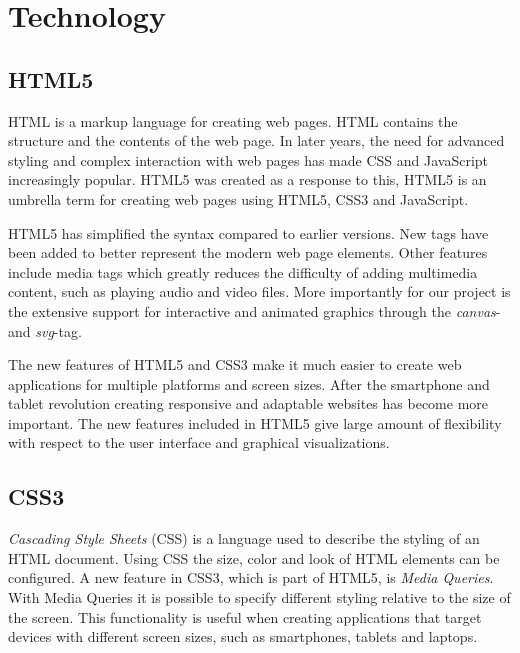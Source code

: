 \chapter{Technology} %

\label{Chapter2} %


\section{HTML5}
HTML is a markup language for creating web pages. HTML contains the structure and the contents of the web page. In later years, the need for advanced styling and complex interaction with web pages has made CSS and JavaScript increasingly popular. HTML5 was created as a response to this, HTML5 is an umbrella term for creating web pages using HTML5, CSS3 and JavaScript.

HTML5 has simplified the syntax compared to earlier versions. New tags have been added to better represent the modern web page elements. Other features include media tags which greatly reduces the difficulty of adding multimedia content, such as playing audio and video files. More importantly for our project is the extensive support for interactive and animated graphics through the \emph{canvas}- and \emph{svg}-tag.

The new features of HTML5 and CSS3 make it much easier to create web applications for multiple platforms and screen sizes. After the smartphone and tablet revolution creating responsive and adaptable websites has become more important. The new features included in HTML5 give large amount of flexibility with respect to the user interface and graphical visualizations.

\section{CSS3}
\emph{Cascading Style Sheets} (CSS) is a language used to describe the styling of an HTML document. Using CSS the size, color and look of HTML elements can be configured. A new feature in CSS3, which is part of HTML5, is \emph{Media Queries}. With Media Queries it is possible to specify different styling relative to the size of the screen. This functionality is useful when creating applications that target devices with different screen sizes, such as smartphones, tablets and laptops. 

